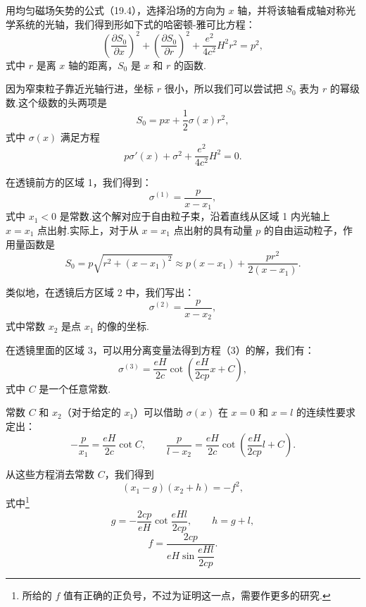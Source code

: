 \begin{xiti}
用均匀磁场矢势的公式（19.4），选择沿场的方向为 $x$ 轴，并将该轴看成轴对称光学系统的光轴，我们得到形如下式的哈密顿-雅可比方程：
\begin{equation*}
  \left(\frac{\partial S_0}{\partial x}\right)^2
  +\left(\frac{\partial S_0}{\partial r}\right)^2
  +\frac{e^2}{4c^2}H^2r^2=p^2,
  \tag{1}
\end{equation*}
式中 $r$ 是离 $x$ 轴的距离，$S_0$ 是 $x$ 和 $r$ 的函数.

因为窄束粒子靠近光轴行进，坐标 $r$ 很小，所以我们可以尝试把 $S_0$ 表为 $r$ 的幂级数.这个级数的头两项是
\begin{equation*}
  S_0=px+\frac{1}{2}\sigma(x)r^2,
  \tag{2}
\end{equation*}
式中 $\sigma(x)$ 满足方程
\begin{equation*}
  p\sigma'(x)+\sigma^2+\frac{e^2}{4c^2}H^2=0.
  \tag{3}
\end{equation*}

在透镜前方的区域 1，我们得到：
\begin{equation*}
  \sigma^{(1)}=\frac{p}{x-x_1},
\end{equation*}
式中 $x_1<0$ 是常数.这个解对应于自由粒子束，沿着直线从区域 1 内光轴上 $x=x_1$ 点出射.实际上，对于从 $x=x_1$ 点出射的具有动量 $p$ 的自由运动粒子，作用量函数是
\begin{equation*}
  S_0=p\sqrt{r^2+(x-x_1)^2}
  \approx p(x-x_1)+\frac{pr^2}{2(x-x_1)}.
\end{equation*}

类似地，在透镜后方区域 2 中，我们写出：
\begin{equation*}
  \sigma^{(2)}=\frac{p}{x-x_2},
\end{equation*}
式中常数 $x_2$ 是点 $x_1$ 的像的坐标.

在透镜里面的区域 3，可以用分离变量法得到方程（3）的解，我们有：
\begin{equation*}
  \sigma^{(3)}=\frac{eH}{2c}\cot\left(\frac{eH}{2cp}x+C\right),
\end{equation*}
式中 $C$ 是一个任意常数.

常数 $C$ 和 $x_2$（对于给定的 $x_1$）可以借助 $\sigma(x)$ 在 $x=0$ 和 $x=l$ 的连续性要求定出：
\begin{equation*}
  -\frac{p}{x_1}=\frac{eH}{2c}\cot C,\qquad
  \frac{p}{l-x_2}=\frac{eH}{2c}\cot\left(\frac{eH}{2cp}l+C\right).
\end{equation*}

从这些方程消去常数 $C$，我们得到
\begin{equation*}
  (x_1-g)(x_2+h)=-f^2,
\end{equation*}
式中\footnote{所给的 $f$ 值有正确的正负号，不过为证明这一点，需要作更多的研究.}
\begin{equation*}
  g=-\frac{2cp}{eH}\cot\frac{eHl}{2cp},\qquad h=g+l,
\end{equation*}
\begin{equation*}
  f=\frac{2cp}{eH\sin\dfrac{eHl}{2cp}}.
\end{equation*}

\end{xiti}

